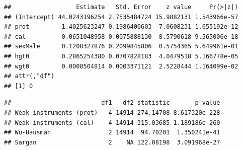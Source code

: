 \documentclass[
]{book}
\newenvironment{Shaded}{\begin{snugshade}}{\end{snugshade}}
\newcommand{\CommentTok}[1]{\textcolor[rgb]{0.56,0.35,0.01}{\textit{#1}}}
\newcommand{\DataTypeTok}[1]{\textcolor[rgb]{0.13,0.29,0.53}{#1}}
\newcommand{\KeywordTok}[1]{\textcolor[rgb]{0.13,0.29,0.53}{\textbf{#1}}}
\newcommand{\NormalTok}[1]{#1}
\newcommand{\OperatorTok}[1]{\textcolor[rgb]{0.81,0.36,0.00}{\textbf{#1}}}
\newcommand{\OtherTok}[1]{\textcolor[rgb]{0.56,0.35,0.01}{#1}}
\newcommand{\StringTok}[1]{\textcolor[rgb]{0.31,0.60,0.02}{#1}}
\begin{document}
\begin{Shaded}
\end{Shaded}

\begin{verbatim}
##                  Estimate   Std. Error    z value     Pr(>|z|)
## (Intercept) 44.0243196254 2.7535484724 15.9882131 1.543966e-57
## prot        -1.4025623247 0.1986400603 -7.0608231 1.655192e-12
## cal          0.0651048958 0.0075888130  8.5790618 9.565006e-18
## sexMale      0.1208327876 0.2099845806  0.5754365 5.649961e-01
## hgt0         0.2865254380 0.0707828183  4.0479518 5.166778e-05
## wgt0         0.0008504814 0.0003371121  2.5228444 1.164099e-02
## attr(,"df")
## [1] 0
\end{verbatim}

\begin{Shaded}
\end{Shaded}

\begin{verbatim}
##                         df1   df2 statistic       p-value
## Weak instruments (prot)   4 14914 274.14708 8.617320e-228
## Weak instruments (cal)    4 14914 315.03685 1.189186e-260
## Wu-Hausman                2 14914  94.70201  1.350241e-41
## Sargan                    2    NA 122.08198  3.091968e-27
\end{verbatim}
\end{document}
